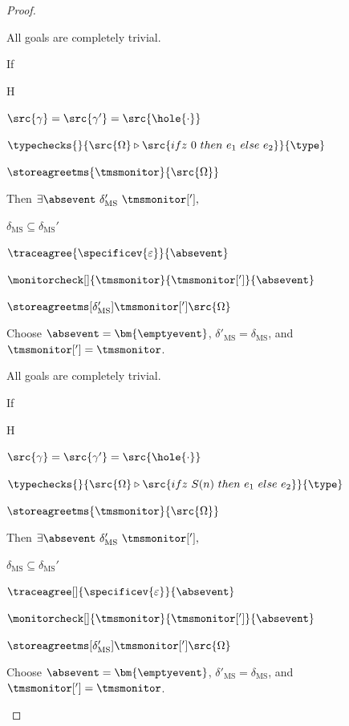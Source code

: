 \documentclass[a4paper,names,dvipsnames]{article}
\begin{document}
\begin{proof}
\begin{description}
      All goals are completely trivial.


      If
      \begin{passumptions}{H}
        \item $\src{\gamma}=\src{\gamma'}=\src{\hole{\cdot}}$
        \item $\typechecks{}{\src{\Omega}\triangleright\src{ifz\ 0\ then\ e_1\ else\ e_2}}{\type}$
        \item $\storeagreetms{\tmsmonitor}{\src{\Omega}}$
      \end{passumptions}
      Then $\exists \absevent\ \delta_{\text{MS}}'\ \tmsmonitor['],$
      \begin{goals}
        \item $\delta_{\text{MS}}\subseteq\delta_{\text{MS}}'$
        \item $\traceagree{\specificev{\varepsilon}}{\absevent}$
        \item $\monitorcheck[]{\tmsmonitor}{\tmsmonitor[']}{\absevent}$
        \item $\storeagreetms[\delta_{\text{MS}}']{\tmsmonitor[']}{\src{\Omega}}$
      \end{goals}
      Choose $\absevent=\bm{\emptyevent}$, $\delta'_{\text{MS}}=\delta_{\text{MS}}$, and $\tmsmonitor[']=\tmsmonitor$.

      All goals are completely trivial.

      If
      \begin{passumptions}{H}
        \item $\src{\gamma}=\src{\gamma'}=\src{\hole{\cdot}}$
        \item $\typechecks{}{\src{\Omega}\triangleright\src{ifz\ S(n)\ then\ e_1\ else\ e_2}}{\type}$
        \item $\storeagreetms{\tmsmonitor}{\src{\Omega}}$
      \end{passumptions}
      Then $\exists \absevent\ \delta_{\text{MS}}'\ \tmsmonitor['],$
      \begin{goals}
        \item $\delta_{\text{MS}}\subseteq\delta_{\text{MS}}'$
        \item $\traceagree[]{\specificev{\varepsilon}}{\absevent}$
        \item $\monitorcheck[]{\tmsmonitor}{\tmsmonitor[']}{\absevent}$
        \item $\storeagreetms[\delta_{\text{MS}}']{\tmsmonitor[']}{\src{\Omega}}$
      \end{goals}
      Choose $\absevent=\bm{\emptyevent}$, $\delta'_{\text{MS}}=\delta_{\text{MS}}$, and $\tmsmonitor[']=\tmsmonitor$.


\end{description}
\end{proof}
\end{document}
